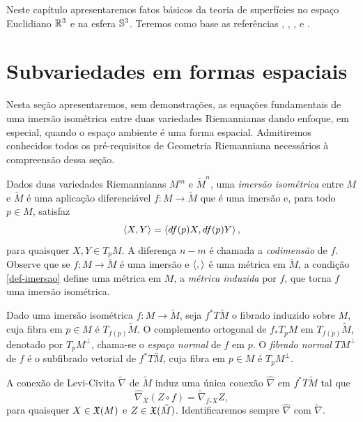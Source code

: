 Neste capítulo apresentaremos fatos básicos da teoria de superfícies no espaço Euclidiano $\mathbb{R}^3$ e na esfera $\mathbb{S}^3$. Teremos como base as referências \cite{Carmo1987}, \cite{Meeks2012}, \cite{Nitsche2011}, \cite{Brendle2013} e \cite{Dajczer2019}.

\section{Subvariedades em formas espaciais}

Nesta seção apresentaremos, sem demonstrações, as equações fundamentais de uma imersão isométrica entre duas variedades Riemannianas dando enfoque, em especial, quando o espaço ambiente é uma forma espacial. Admitiremos conhecidos todos os pré-requisitos de Geometria Riemanniana necessários à compreensão dessa seção.

Dados duas variedades Riemannianas $M^m$ e $\tilde{M}^n$, uma \emph{imersão isométrica} entre $M$ e $\tilde{M}$ é uma aplicação diferenciável $f: M \rightarrow \tilde{M}$ que é uma imersão e, para todo $p \in M$, satisfaz
\begin{equation}\label{def-imersao}
\left\langle X,Y \right\rangle = \left\langle df(p) X,df(p) Y \right\rangle,	
\end{equation}
para quaisquer $X,Y \in T_p M$. A diferença $n-m$ é chamada a \emph{codimensão} de $f$. Observe que se $f: M \rightarrow \tilde{M}$ é uma imersão e $\left\langle , \right\rangle$ é uma métrica em $\tilde{M}$, a condição \eqref{def-imersao} define uma métrica em $M$, a \emph{métrica induzida} por $f$, que torna $f$ uma imersão isométrica.

\begin{definicao}
	Dado uma imersão isométrica $f: M \rightarrow \tilde{M}$, seja $f^* T \tilde{M}$ o fibrado induzido sobre $M$, cuja fibra em $p \in M$ é $T_{f(p)} \tilde{M}$. O complemento ortogonal de $f_* T_p M$ em $T_{f(p)} \tilde{M}$, denotado por $T_p M^\perp$, chama-se o \emph{espaço normal} de $f$ em $p$. O \emph{fibrado normal} $TM^\perp$ de $f$ é o subfibrado vetorial de $f^* T \tilde{M}$, cuja fibra em $p \in M$ é $T_p M^\perp$.
\end{definicao}

A conexão de Levi-Civita $\tilde{\nabla}$ de $\tilde{M}$ induz uma única conexão $\hat{\nabla}$ em $f^* T \tilde{M}$ tal que
\[ \hat{\nabla}_X (Z \circ f) = \tilde{\nabla}_{f_* X} Z, \]
para quaisquer $X \in \mathfrak{X}(M)$ e $Z \in \mathfrak{X}(\tilde{M})$. Identificaremos sempre $\hat{\nabla}$ com $\tilde{\nabla}$.

